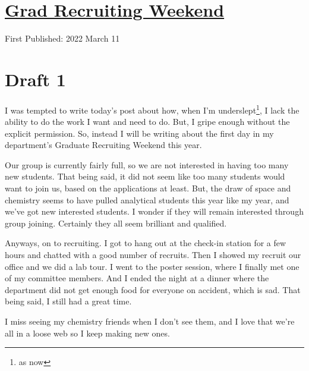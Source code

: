 \documentclass[12pt]{article}[titlepage]
\newcommand{\1}{\={a}}
\newcommand{\2}{\={e}}
\newcommand{\3}{\={\i}}
\newcommand{\4}{\=o}
\newcommand{\5}{\=u}
\newcommand{\6}{\={A}}
\renewcommand{\,}{\textsuperscript{,}}
\begin{document}
\doublespacing
\section{\href{grad-recruiting.html}{Grad Recruiting Weekend}}
First Published: 2022 March 11


\section{Draft 1}
I was tempted to write today's post about how, when I'm underslept\footnote{as now}, I lack the ability to do the work I want and need to do.
But, I gripe enough without the explicit permission.
So, instead I will be writing about the first day in my department's Graduate Recruiting Weekend this year.

Our group is currently fairly full, so we are not interested in having too many new students.
That being said, it did not seem like too many students would want to join us, based on the applications at least.
But, the draw of space and chemistry seems to have pulled analytical students this year like my year, and we've got new interested students.
I wonder if they will remain interested through group joining.
Certainly they all seem brilliant and qualified.

Anyways, on to recruiting.
I got to hang out at the check-in station for a few hours and chatted with a good number of recruits.
Then I showed my recruit our office and we did a lab tour.
I went to the poster session, where I finally met one of my committee members.
And I ended the night at a dinner where the department did not get enough food for everyone on accident, which is sad.
That being said, I still had a great time.

I miss seeing my chemistry friends when I don't see them, and I love that we're all in a loose web so I keep making new ones.
\end{document}
